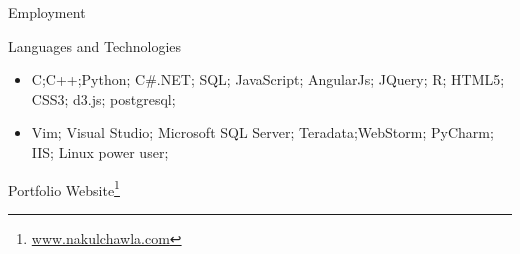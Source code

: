 \documentclass[]{nakulcv}
\begin{document}
\begin{cvsection}{Employment}
	\end{cvsection}
	\begin{cvsection}{Languages and Technologies}
		\begin{cvsubsection}{}{}{}	
			\begin{itemize}
				\item C;C++;Python; C\#.NET; SQL; JavaScript; AngularJs; JQuery; R; HTML5; CSS3; d3.js; postgresql;
				\item Vim; Visual Studio; Microsoft SQL Server; Teradata;WebStorm; PyCharm; IIS; Linux power user;
			\end{itemize}
		\end{cvsubsection}
	\end{cvsection}
Portfolio Website\footnote{\url{www.nakulchawla.com}}
\end{document}
